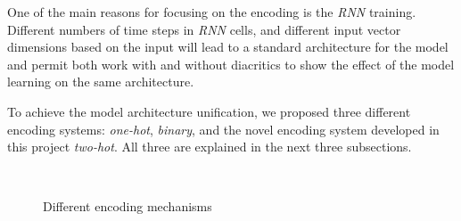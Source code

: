 One of the main reasons for focusing on the encoding is the \textit{RNN} training. 
Different numbers of time steps in \textit{RNN} cells, and different input vector dimensions based on the input will lead to a standard architecture for the model and permit both work with and without diacritics to show the effect of the model learning on the same architecture.

To achieve the model architecture unification, we proposed three different encoding systems: \textit{one-hot}, \textit{binary}, and the novel encoding system developed in this project \textit{two-hot}. All three are explained in the next three subsections.

\begin{figure}[!t]
 \centering
 
 \caption{Different encoding mechanisms%
 }~\label{Fig:One_binary_Encoding}
\end{figure}



